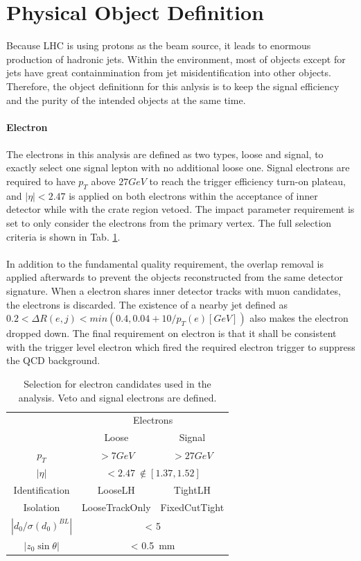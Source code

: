 \section{Physical Object Definition}
Because LHC is using protons as the beam source, it leads to enormous production of hadronic jets. Within the environment, most of objects except for jets have great containmination from jet misidentification into other objects. Therefore, the object definitionn for this anlysis is to keep the signal efficiency and the purity of the intended objects at the same time. 
\\
\\{\bf Electron}
\\
\\The electrons in this analysis are defined as two types, loose and signal, to exactly select one signal lepton with no additional loose one. Signal electrons are required to have $p_{T}$ above $27GeV$ to reach the trigger efficiency turn-on plateau, and $|\eta|<2.47$ is applied on both electrons within the acceptance of inner detector while with the crate region vetoed. The impact parameter requirement is set to only consider the electrons from the primary vertex. The full selection criteria is shown in Tab. \ref{Tab:eledefin}.
\\
\\In addition to the fundamental quality requirement, the overlap removal is applied afterwards to prevent the objects reconstructed from the same detector signature. When a electron shares inner detector tracks with muon candidates, the electrons is discarded. The existence of a nearby jet defined as $0.2<\Delta R(e,j)<min(0.4,0.04+10/p_{T}(e)[GeV])$ also makes the electron dropped down. The final requirement on electron is that it shall be consistent with the trigger level electron which fired the required electron trigger to suppress the QCD background. 
\begin{table}[htb]
	\caption{Selection for electron candidates used in the analysis. Veto and signal electrons are defined.}\label{Tab:eledefin}
	\centering
	\begin{tabular}{|c||c|c|}
		\hline
		& \multicolumn{2}{c|}{ Electrons}\\
		&   Loose & Signal \\
		\hline
		$p_T$ & $>7GeV$ & $>27GeV$  \\
		\hline
		$| \eta |$ &  \multicolumn{2}{c|}{ $< 2.47 ~ \notin [1.37,1.52]$ } \\
		\hline
		Identification & LooseLH & TightLH   \\
		\hline
		Isolation       &   LooseTrackOnly & FixedCutTight  \\
		\hline
		$|d_0/\sigma(d_0)^{BL}|$ &   \multicolumn{2}{|c|}{  < 5}  \\
		\hline
		$|z_0\sin\theta| $  & \multicolumn{2}{|c|}{< 0.5~mm}  \\
		\hline
	\end{tabular}
\end{table}
